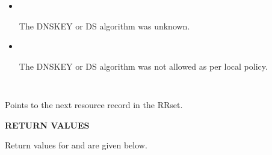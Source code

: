 \begin{description}
\begin{description}
\begin{itemize}
The DNSKEY or DS algorithm was not supported.

\item {}\verb" "

The DNSKEY or DS algorithm was unknown.

\item {}\verb" "

The DNSKEY or DS algorithm was not allowed as per local policy.

\end{itemize}


\item {}\verb" "

Points to the next resource record in the RRset.

\end{description}

\end{description}

{\bf RETURN VALUES}

Return values for  and
 are given below.

